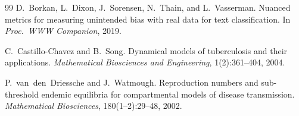 \documentclass[11pt]{article}
\begin{document}
\begin{thebibliography}{99}
D.~Borkan, L.~Dixon, J.~Sorensen, N.~Thain, and L.~Vasserman.
Nuanced metrics for measuring unintended bias with real data for text classification.
In \textit{Proc.\ WWW Companion}, 2019.

C.~Castillo-Chavez and B.~Song.
Dynamical models of tuberculosis and their applications.
\textit{Mathematical Biosciences and Engineering}, 1(2):361--404, 2004.

P.~van~den~Driessche and J.~Watmough.
Reproduction numbers and sub-threshold endemic equilibria for compartmental models of disease transmission.
\textit{Mathematical Biosciences}, 180(1--2):29--48, 2002.

\end{thebibliography}
\endgroup
\end{document}
